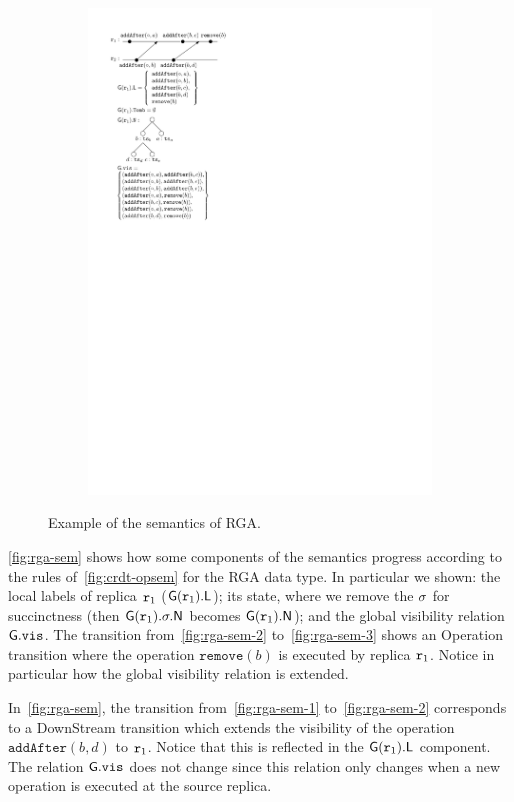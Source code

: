 \begin{figure}[t]
\begin{subfigure}[!ht]{.3\linewidth}
    \includegraphics[scale=.7]{figures/LinRGA-3}
    \caption{}
    \label{fig:rga-sem-3}
  \end{subfigure}
  \caption{Example of the semantics of RGA.}
  \label{fig:rga-sem}
\end{figure}

\autoref{fig:rga-sem} shows how some components of the semantics
progress according to the rules of~\autoref{fig:crdt-opsem} for the
RGA data type.
%
In particular we shown: the local labels of replica $\mathtt{r}_1$
($\mathsf{G}(\mathtt{r}_1).\mathsf{L}$); its state, where we remove the
$\sigma$ for succinctness (then $\mathsf{G}(\mathtt{r}_1).\sigma.\mathsf{N}$
becomes $\mathsf{G}(\mathtt{r}_1).\mathsf{N}$); and the global visibility
relation $\mathsf{G}.\mathtt{vis}$.
%
The transition from~\autoref{fig:rga-sem-2} to~\autoref{fig:rga-sem-3}
shows an {\sc Operation} transition where the operation
$\mathtt{remove}(b)$ is executed by replica $\mathtt{r}_1$.
%
Notice in particular how the global visibility relation is extended.

In~\autoref{fig:rga-sem}, the transition from~\autoref{fig:rga-sem-1}
to~\autoref{fig:rga-sem-2} corresponds to a {\sc DownStream}
transition which extends the visibility of the operation
$\mathtt{addAfter}(b, d)$ to $\mathtt{r}_1$.
%
Notice that this is reflected in the $\mathsf{G}(\mathtt{r}_1).\mathsf{L}$
component.
%
The relation $\mathsf{G}.\mathtt{vis}$ does not change since this
relation only changes when a new operation is executed at the source
replica.
